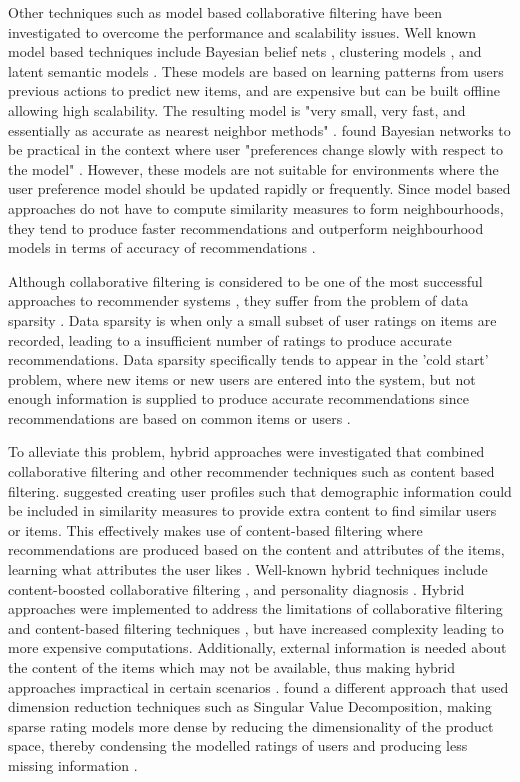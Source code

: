 Other techniques such as model based collaborative filtering have been investigated to overcome the performance and scalability issues. Well known model based techniques include Bayesian belief nets \cite{baysian}, clustering models \cite{clustering}, and latent semantic models \cite{latent}. These models are based on learning patterns from users previous actions to predict new items, and are expensive but can be built offline allowing high scalability. The resulting model is "very small, very fast, and essentially as accurate as nearest neighbor methods" \cite{itembased}. \citeauthor{itembased} found Bayesian networks to be practical in the context where user "preferences change slowly with respect to the model" \cite{itembased}. However, these models are not suitable for environments where the user preference model should be updated rapidly or frequently. Since model based approaches do not have to compute similarity measures to form neighbourhoods, they tend to produce faster recommendations and outperform neighbourhood models in terms of accuracy of recommendations \cite{toward, itembased}. 

Although collaborative filtering is considered to be one of the most successful approaches to recommender systems \cite{survey, toward}, they suffer from the problem of data sparsity \cite{toward, survey, itembased, koren2009matrix, koren2011, dimension}. Data sparsity is when only a small subset of user ratings on items are recorded, leading to a insufficient number of ratings to produce accurate recommendations. Data sparsity specifically tends to appear in the 'cold start' problem, where new items or new users are entered into the system, but not enough information is supplied to produce accurate recommendations since recommendations are based on common items or users \cite{survey}.

To alleviate this problem, hybrid approaches were investigated that combined collaborative filtering and other recommender techniques such as content based filtering. \citeauthor{toward} suggested creating user profiles such that demographic information could be included in similarity measures to provide extra content to find similar users or items. This effectively makes use of content-based filtering where recommendations are produced based on the content and attributes of the items, learning what attributes the user likes \cite{toward}. Well-known hybrid techniques include content-boosted collaborative filtering \cite{hybrid}, and personality diagnosis \cite{hybrid2, survey}. Hybrid approaches were implemented to address the limitations of collaborative filtering and content-based filtering techniques \cite{toward}, but have increased complexity leading to more expensive computations. Additionally, external information is needed about the content of the items which may not be available, thus making hybrid approaches impractical in certain scenarios \cite{survey}. \citeauthor{dimension} found a different approach that used dimension reduction techniques such as Singular Value Decomposition, making sparse rating models more dense by reducing the dimensionality of the product space, thereby condensing the modelled ratings of users and producing less missing information \cite{dimension}. 

